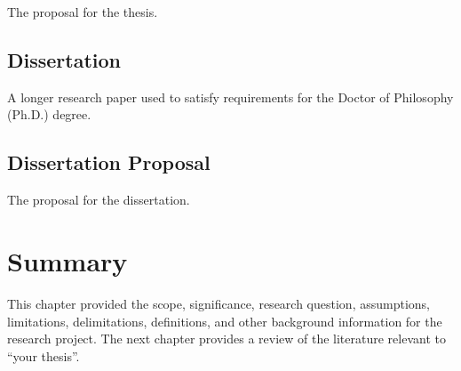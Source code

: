 The proposal for the thesis.


\subsection{Dissertation}

A longer research paper used to satisfy requirements for the Doctor of Philosophy (Ph.D.) degree.


\subsection{Dissertation Proposal}

The proposal for the dissertation.


\section{Summary}

This chapter provided the scope, significance, research question, assumptions, limitations, delimitations, definitions, and other background information for the research project.
The next chapter provides a review of the literature relevant to ``your thesis''.